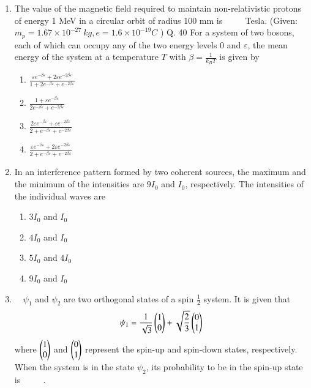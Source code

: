 \documentclass[journal]{IEEEtran}
\begin{document}
\begin{enumerate}
  \item The value of the magnetic field required to maintain non-relativistic protons of energy 1 MeV in a circular orbit of radius 100 mm is $\qquad$ Tesla.
(Given: $m_{p}=1.67 \times 10^{-27} {~kg}, e=1.6 \times 10^{-19} {C}$ )
Q. 40 For a system of two bosons, each of which can occupy any of the two energy levels 0 and $\varepsilon$, the mean energy of the system at a temperature $T$ with $\beta=\frac{1}{k_{B} T}$ is given by
 \begin{multicols}{4}
			\begin{enumerate}
   
 
   \item$\frac{\varepsilon e^{-\beta \varepsilon}+2 \varepsilon e^{-2 \beta \varepsilon}}{1+2 e^{-\beta \varepsilon}+e^{-2 \beta \varepsilon}}$
\item  $\frac{1+\varepsilon e^{-\beta \varepsilon}}{2 e^{-\beta \varepsilon}+e^{-2 \beta \varepsilon}}$
\item  $\frac{2 \varepsilon e^{-\beta \varepsilon}+\varepsilon e^{-2 \beta \varepsilon}}{2+e^{-\beta \varepsilon}+e^{-2 \beta \varepsilon}}$
\item $\frac{\varepsilon e^{-\beta \varepsilon}+2 \varepsilon e^{-2 \beta \varepsilon}}{2+e^{-\beta \varepsilon}+e^{-2 \beta \varepsilon}}$
 \end{enumerate}
	\end{multicols}
  \item In an interference pattern formed by two coherent sources, the maximum and the minimum of the intensities are $9 I_{0}$ and $I_{0}$, respectively. The intensities of the individual waves are
  

\begin{multicols}{4}
			\begin{enumerate}
   \item $3 I_{0}$ and $I_{0}$
\item  $4 I_{0}$ and $I_{0}$
\item $5 I_{0}$ and $4 I_{0}$
\item $9 I_{0}$ and $I_{0}$
\end{enumerate}
		\end{multicols}
  \item  $\quad \psi_{1}$ and $\psi_{2}$ are two orthogonal states of a spin $\frac{1}{2}$ system. It is given that
$$
\psi_{1}=\frac{1}{\sqrt{3}}\begin{pmatrix}{1}\\{0}\end{pmatrix}+\sqrt{\frac{2}{3}}\begin{pmatrix}{0}\\{1}\end{pmatrix}
$$
where $\begin{pmatrix}{1}\\{0}\end{pmatrix}$ and $\begin{pmatrix}{0} \\{1}\end{pmatrix}$ represent the spin-up and spin-down states, respectively. When the system is in the state $\psi_{2}$, its probability to be in the spin-up state is $\qquad$ .
 
			
		
 \end{enumerate}
\end{document}
